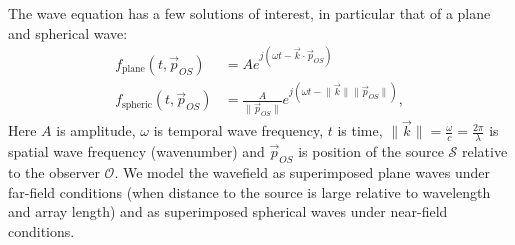 {The wave equation has a few solutions of interest, in particular that of a plane and spherical wave:
%
\begin{align}
f_\textrm{plane}(t,\vec{p}_{OS})  &= A e^{j(\omega t - \vec{k} \cdot \vec{p}_{OS})} \\
f_\textrm{spheric}(t,\vec{p}_{OS}) &= \frac{A}{\lVert \vec{p}_{OS} \rVert} e^{j(\omega t - \lVert\vec{k}\rVert \lVert \vec{p}_{OS} \rVert)},
\end{align}
% 
Here $A$ is amplitude, $\omega$ is temporal wave frequency, $t$ is time, $\lVert\vec{k}\rVert=\frac{\omega}{c}=\frac{2\pi}{\lambda}$ is spatial wave frequency (wavenumber) and $\vec{p}_{OS}$ is position of the source $\mathcal{S}$ relative to the observer $\mathcal{O}$. We model the wavefield as superimposed plane waves under far-field conditions (when distance to the source is large relative to wavelength and array length) and as superimposed spherical waves under near-field conditions. 

% 
% 
% 


%

%





}
